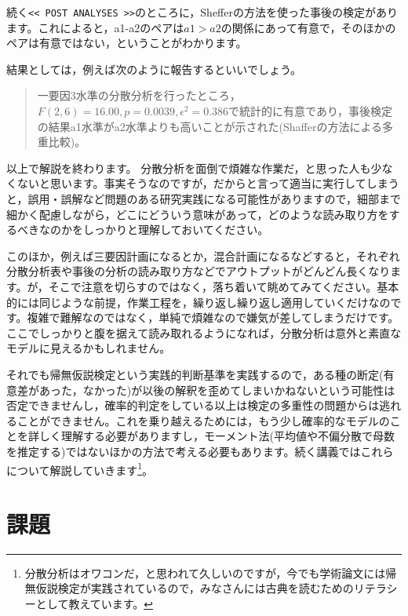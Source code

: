 \documentclass{ltjsarticle}
\begin{document}
続く\verb|<< POST ANALYSES >>|のところに，Shefferの方法を使った事後の検定があります。これによると，a1-a2のペアは$a1 > a2$の関係にあって有意で，そのほかのペアは有意ではない，ということがわかります。

結果としては，例えば次のように報告するといいでしょう。
\begin{quote}
一要因3水準の分散分析を行ったところ，$F(2,6)=16.00,p=0.0039,\epsilon^2=0.386$で統計的に有意であり，事後検定の結果a1水準がa2水準よりも高いことが示された(Shafferの方法による多重比較)。
\end{quote}

以上で解説を終わります。
分散分析を面倒で煩雑な作業だ，と思った人も少なくないと思います。事実そうなのですが，だからと言って適当に実行してしまうと，誤用・誤解など問題のある研究実践になる可能性がありますので，細部まで細かく配慮しながら，どこにどういう意味があって，どのような読み取り方をするべきなのかをしっかりと理解しておいてください。

このほか，例えば三要因計画になるとか，混合計画になるなどすると，それぞれ分散分析表や事後の分析の読み取り方などでアウトプットがどんどん長くなります。が，そこで注意を切らすのではなく，落ち着いて眺めてみてください。基本的には同じような前提，作業工程を，繰り返し繰り返し適用していくだけなのです。複雑で難解なのではなく，単純で煩雑なので嫌気が差してしまうだけです。ここでしっかりと腹を据えて読み取れるようになれば，分散分析は意外と素直なモデルに見えるかもしれません。

それでも帰無仮説検定という実践的判断基準を実践するので，ある種の断定(有意差があった，なかった)が以後の解釈を歪めてしまいかねないという可能性は否定できませんし，確率的判定をしている以上は検定の多重性の問題からは逃れることができません。これを乗り越えるためには，もう少し確率的なモデルのことを詳しく理解する必要がありますし，モーメント法(平均値や不偏分散で母数を推定する)ではないほかの方法で考える必要もあります。続く講義ではこれらについて解説していきます\footnote{分散分析はオワコンだ，と思われて久しいのですが，今でも学術論文には帰無仮説検定が実践されているので，みなさんには古典を読むためのリテラシーとして教えています。}。
\section{課題}
\end{document}
